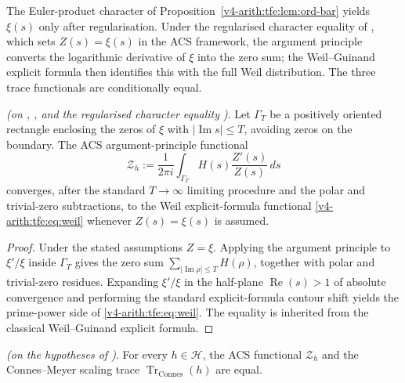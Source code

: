 The Euler-product character of Proposition~\ref{v4-arith:tfe:lem:ord-bar}
yields $\xi(s)$ only after regularisation. Under the regularised
character equality of , which
sets $Z(s) = \xi(s)$ in the ACS framework, the argument principle
converts the logarithmic derivative of $\xi$ into the zero sum; the
Weil--Guinand explicit formula then identifies this with the full Weil
distribution. The three trace functionals are conditionally equal.

\begin{theorem}
\label{v4-arith:tfe:thm:equiv}
\ClaimStatusConditional \emph{(on
,
, and the
regularised character equality
)}. Let \(\Gamma_T\) be a
positively oriented rectangle enclosing the zeros of \(\xi\) with
\(|\operatorname{Im}s|\leq T\), avoiding zeros on the boundary. The ACS argument-principle functional
\begin{equation}
\label{v4-arith:tfe:eq:z-pairing}
\mathcal Z_h:=
\frac{1}{2\pi i}\int_{\Gamma_T}
H(s)\frac{Z'(s)}{Z(s)}\,ds
\end{equation}
converges, after the standard \(T\to\infty\) limiting procedure and
the polar and trivial-zero subtractions, to the Weil explicit-formula
functional \eqref{v4-arith:tfe:eq:weil} whenever \(Z(s)=\xi(s)\) is
assumed.
\end{theorem}

\begin{proof}
Under the stated assumptions \(Z=\xi\). Applying the argument
principle to \(\xi'/\xi\) inside \(\Gamma_T\) gives the zero sum
\(\sum_{|\operatorname{Im}\rho|\leq T}H(\rho)\), together with polar
and trivial-zero residues. Expanding \(\xi'/\xi\) in the
half-plane \(\operatorname{Re}(s) > 1\) of absolute convergence
and performing the standard explicit-formula contour shift yields
the prime-power side of \eqref{v4-arith:tfe:eq:weil}. The equality
is inherited from the classical Weil--Guinand explicit formula.
\end{proof}

\begin{corollary}
\label{v4-arith:tfe:cor:info-equiv}
\ClaimStatusConditional \emph{(on the hypotheses of
)}. For every \(h \in \mathcal H\), the
ACS functional \(\mathcal{Z}_h\) and the Connes--Meyer scaling trace
\(\operatorname{Tr}_{\mathrm{Connes}}(h)\) are equal.
\end{corollary}

